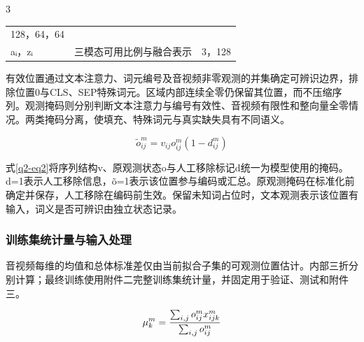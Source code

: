 \begin{PaperTable}{3}
\begin{table}[!htbp]
\begin{tabular}{@{}lll@{}}
\begin{minipage}[t]{\dimexpr 0.330000\linewidth-1.320000\tabcolsep\relax}
128，64，64\strut
\end{minipage}\tabularnewline
\begin{minipage}[t]{\dimexpr 0.230000\linewidth-0.920000\tabcolsep\relax}\raggedright
aᵢ，zᵢ\strut
\end{minipage} & \begin{minipage}[t]{\dimexpr 0.440000\linewidth-1.760000\tabcolsep\relax}\raggedright
三模态可用比例与融合表示\strut
\end{minipage} & \begin{minipage}[t]{\dimexpr 0.330000\linewidth-1.320000\tabcolsep\relax}\raggedright
3，128\strut
\end{minipage}\tabularnewline
\bottomrule
\end{tabular}
\end{table}

\end{PaperTable}

有效位置通过文本注意力、词元编号及音视频非零观测的并集确定可辨识边界，排除位置0与CLS、SEP特殊词元。区域内部连续全零仍保留其位置，而不压缩序列。观测掩码则分别判断文本注意力与编号有效性、音视频有限性和整向量全零情况。两类掩码分离，使填充、特殊词元与真实缺失具有不同语义。

\begin{equation}
\widetilde{o}_{ij}^{m}=v_{ij}o_{ij}^{m}(1-d_{ij}^{m})\label{q2-eq2}
\end{equation}

式\eqref{q2-eq2}将序列结构v、原观测状态o与人工移除标记d统一为模型使用的掩码。d=1表示人工移除信息，õ=1表示该位置参与编码或汇总。原观测掩码在标准化前确定并保存，人工移除在编码前生效。保留未知词占位时，文本观测表示该位置有输入，词义是否可辨识由独立状态记录。

\hypertarget{q2-ux8badux7ec3ux96c6ux7edfux8ba1ux91cfux4e0eux8f93ux5165ux5904ux7406}{%
\subsubsection{训练集统计量与输入处理}\label{q2-ux8badux7ec3ux96c6ux7edfux8ba1ux91cfux4e0eux8f93ux5165ux5904ux7406}}

音视频每维的均值和总体标准差仅由当前拟合子集的可观测位置估计。内部三折分别计算；最终训练使用附件二完整训练集统计量，并固定用于验证、测试和附件三。

\begin{equation}
\mu_k^m={\sum_{i,j}o_{ij}^m x_{ijk}^m\over\sum_{i,j}o_{ij}^m}\label{q2-eq3}
\end{equation}

